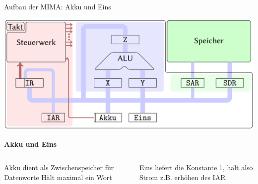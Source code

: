 \begin{frame}{Aufbau der MIMA: Akku und Eins}
	\begin{center}\includegraphics[width=.6\textwidth]{images/mima_aufbau.png}\end{center}
	
	\bp
	
	\textcolor{kit-orange50}{\textbf{Akku und Eins}}
	
	\begin{columns}
		\begin{column}{0.5\textwidth}
			\begin{itemize}
				\pitem Akku dient als Zwischenspeicher für Datenworte
				\pitem Hält maximal ein Wort
			\end{itemize}
		\end{column}
		
		\begin{column}{0.5\textwidth}
			\begin{itemize}
				\pitem Eins liefert die Konstante 1, hält also Strom
				\pitem z.B. erhöhen des IAR
			\end{itemize}
		\end{column}
	\end{columns}
	
\end{frame}


